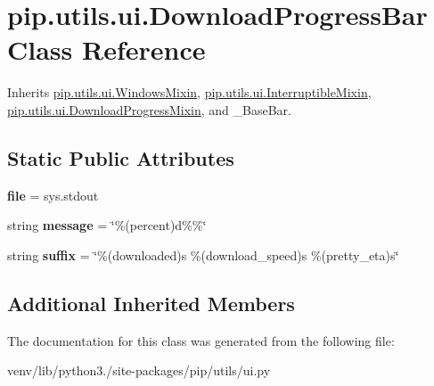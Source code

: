 \hypertarget{classpip_1_1utils_1_1ui_1_1_download_progress_bar}{}\section{pip.\+utils.\+ui.\+Download\+Progress\+Bar Class Reference}
\label{classpip_1_1utils_1_1ui_1_1_download_progress_bar}


Inherits \hyperlink{classpip_1_1utils_1_1ui_1_1_windows_mixin}{pip.\+utils.\+ui.\+Windows\+Mixin}, \hyperlink{classpip_1_1utils_1_1ui_1_1_interruptible_mixin}{pip.\+utils.\+ui.\+Interruptible\+Mixin}, \hyperlink{classpip_1_1utils_1_1ui_1_1_download_progress_mixin}{pip.\+utils.\+ui.\+Download\+Progress\+Mixin}, and \+\_\+\+Base\+Bar.

\subsection*{Static Public Attributes}
\begin{DoxyCompactItemize}
\item 
\mbox{\label{classpip_1_1utils_1_1ui_1_1_download_progress_bar_a2e3806522b653410739cee330211cc0b}} 
{\bfseries file} = sys.\+stdout
\item 
\mbox{\label{classpip_1_1utils_1_1ui_1_1_download_progress_bar_aa17aebfce20c499fcbab0bdd6912137b}} 
string {\bfseries message} = \char`\"{}\%(percent)d\%\%\char`\"{}
\item 
\mbox{\label{classpip_1_1utils_1_1ui_1_1_download_progress_bar_ae1c48a0727d376ebc4c53c970f0e8900}} 
string {\bfseries suffix} = \char`\"{}\%(downloaded)s \%(download\+\_\+speed)s \%(pretty\+\_\+eta)s\char`\"{}
\end{DoxyCompactItemize}
\subsection*{Additional Inherited Members}


The documentation for this class was generated from the following file\+:\begin{DoxyCompactItemize}
\item 
venv/lib/python3./site-\/packages/pip/utils/ui.\+py\end{DoxyCompactItemize}
